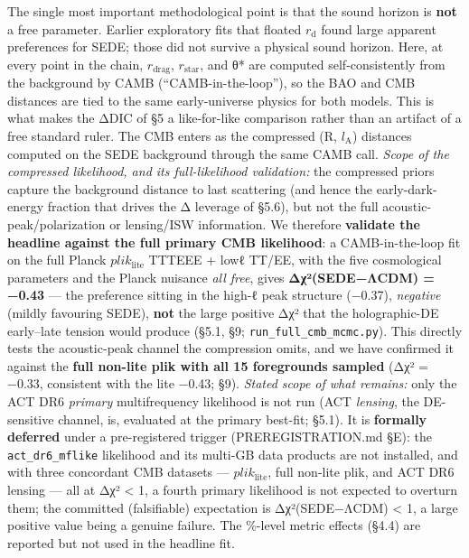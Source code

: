 \documentclass[
  10pt,
]{article}
\begin{document}
The single most important methodological point is that the sound horizon
is \textbf{not} a free parameter. Earlier exploratory fits that floated
\(r_{\mathrm{d}}\) found large apparent preferences for SEDE; those did
not survive a physical sound horizon. Here, at every point in the chain,
\(r_{\mathrm{drag}}\), \(r_{\mathrm{star}}\), and θ* are computed
self-consistently from the background by CAMB (``CAMB-in-the-loop''), so
the BAO and CMB distances are tied to the same early-universe physics
for both models. This is what makes the ΔDIC of §5 a like-for-like
comparison rather than an artifact of a free standard ruler. The CMB
enters as the compressed (R, \(l_{\mathrm{A}}\)) distances computed on
the SEDE background through the same CAMB call. \emph{Scope of the
compressed likelihood, and its full-likelihood validation:} the
compressed priors capture the background distance to last scattering
(and hence the early-dark-energy fraction that drives the Δ leverage of
§5.6), but not the full acoustic-peak/polarization or lensing/ISW
information. We therefore \textbf{validate the headline against the full
primary CMB likelihood}: a CAMB-in-the-loop fit on the full Planck
\(plik_{\mathrm{lite}}\) TTTEEE + lowℓ TT/EE, with the five cosmological
parameters and the Planck nuisance \emph{all free}, gives
\textbf{Δχ²(SEDE−ΛCDM) = −0.43} --- the preference sitting in the high-ℓ
peak structure (−0.37), \emph{negative} (mildly favouring SEDE),
\textbf{not} the large positive Δχ² that the holographic-DE early--late
tension would produce (§5.1, §9; \texttt{run\_full\_cmb\_mcmc.py}). This
directly tests the acoustic-peak channel the compression omits, and we
have confirmed it against the \textbf{full non-lite plik with all 15
foregrounds sampled} (Δχ² = −0.33, consistent with the lite −0.43; §9).
\emph{Stated scope of what remains:} only the ACT DR6 \emph{primary}
multifrequency likelihood is not run (ACT \emph{lensing}, the
DE-sensitive channel, is, evaluated at the primary best-fit; §5.1). It
is \textbf{formally deferred} under a pre-registered trigger
(PREREGISTRATION.md §E): the \texttt{act\_dr6\_mflike} likelihood and
its multi-GB data products are not installed, and with three concordant
CMB datasets --- \(plik_{\mathrm{lite}}\), full non-lite plik, and ACT
DR6 lensing --- all at \textbar Δχ²\textbar{} \textless{} 1, a fourth
primary likelihood is not expected to overturn them; the committed
(falsifiable) expectation is \textbar Δχ²(SEDE−ΛCDM)\textbar{}
\textless{} 1, a large positive value being a genuine failure. The
\%-level metric effects (§4.4) are reported but not used in the headline
fit.
\end{document}
